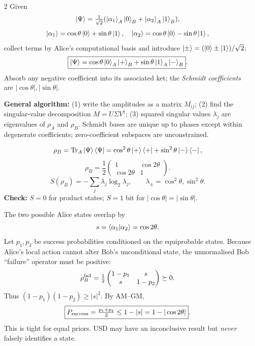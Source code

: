 \begin{multicols}{2}\small
{}
Given
\[\left\lvert \Psi\right\rangle=\tfrac1{\sqrt2}(\left\lvert \alpha_1\right\rangle_A\left\lvert 0\right\rangle_B+\left\lvert \alpha_2\right\rangle_A\left\lvert 1\right\rangle_B),\]
\[\left\lvert \alpha_1\right\rangle=\cos\theta\left\lvert 0\right\rangle+\sin\theta\left\lvert 1\right\rangle,\quad
\left\lvert \alpha_2\right\rangle=\cos\theta\left\lvert 0\right\rangle-\sin\theta\left\lvert 1\right\rangle,\]
collect terms by Alice's computational basis and introduce $\left\lvert \pm\right\rangle=(\left\lvert 0\right\rangle\pm\left\lvert 1\right\rangle)/\sqrt2$:
\[\boxed{\left\lvert \Psi\right\rangle=\cos\theta\left\lvert 0\right\rangle_A\left\lvert +\right\rangle_B+\sin\theta\left\lvert 1\right\rangle_A\left\lvert -\right\rangle_B}.\]
Absorb any negative coefficient into its associated ket; the \emph{Schmidt coefficients} are $|\cos\theta|,|\sin\theta|$.

\textbf{General algorithm:} (1) write the amplitudes as a matrix $M_{ij}$; (2) find the singular-value decomposition $M=U\Sigma V^\dagger$; (3) squared singular values $\lambda_j$ are eigenvalues of $\rho_A$ and $\rho_B$. Schmidt bases are unique up to phases except within degenerate coefficients; zero-coefficient subspaces are unconstrained.

\[\rho_B=\operatorname{Tr}_A\left\lvert \Psi\right\rangle\left\langle \Psi\right\rvert
=\cos^2\theta\left\lvert +\right\rangle\left\langle +\right\rvert+\sin^2\theta\left\lvert -\right\rangle\left\langle -\right\rvert,\]
\[\boxed{\rho_B=\frac12\begin{pmatrix}1&\cos2\theta\\\cos2\theta&1\end{pmatrix}}.\]
\[\boxed{S(\rho_B)=-\sum_j\lambda_j\log_2\lambda_j},\qquad
\lambda_\pm=\cos^2\theta,\sin^2\theta.\]
\textbf{Check:} $S=0$ for product states; $S=1$ bit for $|\cos\theta|=|\sin\theta|$.

The two possible Alice states overlap by
\[s=\left\langle \alpha_1\middle|\alpha_2\right\rangle=\cos 2\theta.\]
Let $p_1,p_2$ be success probabilities conditioned on the equiprobable states. Because Alice's local action cannot alter Bob's unconditional state, the unnormalised Bob ``failure'' operator must be positive:
\[\rho_B^{\rm fail}=\tfrac12\begin{pmatrix}1-p_1&s\\s&1-p_2\end{pmatrix}\succeq0.\]
Thus $(1-p_1)(1-p_2)\ge |s|^2$. By AM--GM,
\[\boxed{P_{\rm success}=\tfrac{p_1+p_2}2\le1-|s|=1-|\cos2\theta|}.\]
This is tight for equal priors. USD may have an inconclusive result but \emph{never} falsely identifies a state.


\end{multicols}
